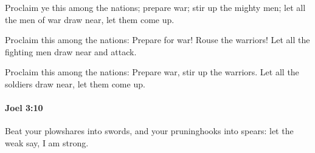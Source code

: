 			\begin{versebox}
					\item[BHS] 
					\item[LXX] 
					\item[ASV] Proclaim ye this among the nations; prepare war; stir up the mighty men; let all the men of war draw near, let them come up.
					\item[NIV] Proclaim this among the nations: Prepare for war! Rouse the warriors! Let all the fighting men draw near and attack.
					\item[NRSV] Proclaim this among the nations: Prepare war, stir up the warriors. Let all the soldiers draw near, let them come up.
			\end{versebox}

		\paragraph{Joel 3:10} %
			\label{JOEL-3-10}

			Beat your plowshares into swords, and your pruninghooks into spears: let the weak say, I am strong.

